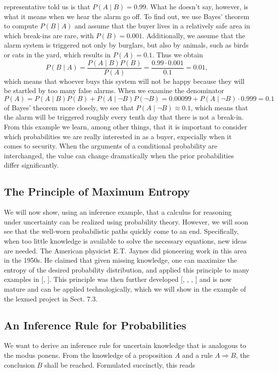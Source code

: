 \documentclass[10pt]{book}
\begin{document}
representative told us is that $P(A \mid B)=0.99$. What he doesn't say, however, is what it means when we hear the alarm go off. To find out, we use Bayes' theorem to compute $P(B \mid A)$ and assume that the buyer lives in a relatively safe area in which break-ins are rare, with $P(B)=0.001$. Additionally, we assume that the alarm system is triggered not only by burglars, but also by animals, such as birds or cats in the yard, which results in $P(A)=0.1$. Thus we obtain
$$
P(B \mid A)=\frac{P(A \mid B) P(B)}{P(A)}=\frac{0.99 \cdot 0.001}{0.1}=0.01,
$$
which means that whoever buys this system will not be happy because they will be startled by too many false alarms. When we examine the denominator
$$
P(A)=P(A \mid B) P(B)+P(A \mid \neg B) P(\neg B)=0.00099+P(A \mid \neg B) \cdot 0.999=0.1
$$
of Bayes' theorem more closely, we see that $P(A \mid \neg B) \approx 0.1$, which means that the alarm will be triggered roughly every tenth day that there is not a break-in.
From this example we learn, among other things, that it is important to consider which probabilities we are really interested in as a buyer, expecially when it comes to security. When the arguments of a conditional probability are interchanged, the value can change dramatically when the prior probabilities differ significantly.

\subsection{The Principle of Maximum Entropy}
We will now show, using an inference example, that a calculus for reasoning under uncertainty can be realized using probability theory. However, we will soon see that the well-worn probabilistic paths quickly come to an end. Specifically, when too little knowledge is available to solve the necessary equations, new ideas are needed. The American physicist E.T. Jaynes did pioneering work in this area in the 1950s. He claimed that given missing knowledge, one can maximize the entropy of the desired probability distribution, and applied this principle to many examples in [\cite{jay57}, \cite{jay03}]. This principle was then further developed [\cite{che83}, \cite{nil86}, \cite{kan89}, \cite{kk92}] and is now mature and can be applied technologically, which we will show in the example of the lexmed project in Sect. 7.3.

\subsection{An Inference Rule for Probabilities}
We want to derive an inference rule for uncertain knowledge that is analogous to the modus ponens. From the knowledge of a proposition $A$ and a rule $A \Rightarrow B$, the conclusion $B$ shall be reached. Formulated succinctly, this reads
\end{document}
